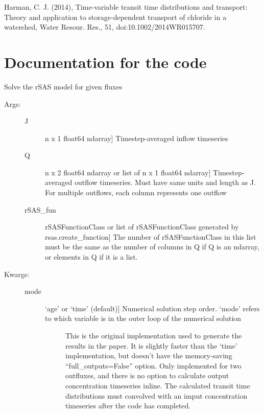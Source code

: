 \documentclass[letterpaper,10pt,english]{sphinxmanual}
\begin{document}
Harman, C. J. (2014), Time-variable transit time distributions and transport:
Theory and application to storage-dependent transport of chloride in a watershed,
Water Resour. Res., 51, doi:10.1002/2014WR015707.


\section{Documentation for the code}
\label{index:documentation-for-the-code}\label{index:module-rsas}

\begin{fulllineitems}
\label{index:rsas.solve}
Solve the rSAS model for given fluxes
\begin{description}
\item[{Args: }] \leavevmode\begin{description}
\item[{J}] \leavevmode{[}n x 1 float64 ndarray{]}
Timestep-averaged inflow timeseries

\item[{Q}] \leavevmode{[}n x 2 float64 ndarray or list of n x 1 float64 ndarray{]}
Timestep-averaged outflow timeseries. Must have same units and length as J.
For multiple outflows, each column represents one outflow

\item[{rSAS\_fun}] \leavevmode{[}rSASFunctionClass or list of rSASFunctionClass generated by rsas.create\_function{]}
The number of rSASFunctionClass in this list must be the same as the 
number of columns in Q if Q is an ndarray, or elements in Q if it is a list.

\end{description}

\item[{Kwargs:}] \leavevmode\begin{description}
\item[{mode}] \leavevmode{[}`age' or `time' (default){]}
Numerical solution step order. `mode' refers to which variable is in the
outer loop of the numerical solution
\begin{description}
\item[{}] \leavevmode
This is the original implementation used to generate the results in the paper.
It is slightly faster than the `time' implementation, but doesn't have the
memory-saving ``full\_outputs=False'' option. Only implemented for two
outfluxes, and there is no option to calculate 
output concentration timeseries inline. The calculated transit time
distributions must convolved with an imput concentration timeseries after the code has 
completed.


\end{description}
\end{description}
\end{description}
\end{fulllineitems}
\end{document}
